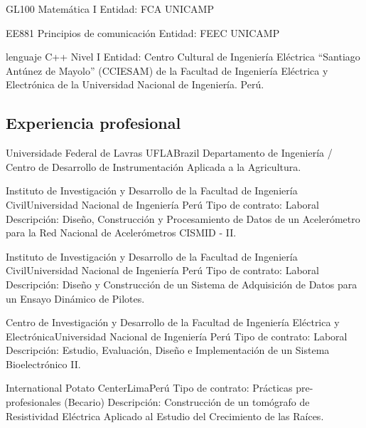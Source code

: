 \documentclass[11pt,a4paper,sans]{moderncv} %
\begin{document}
			  {GL100 }{Matemática I}{}
			  {Entidad: FCA UNICAMP }

			  {EE881 }{Principios de comunicación}{}
			  {Entidad: FEEC UNICAMP }

	      {lenguaje C++ }{ Nivel I}{}
	      {Entidad: Centro Cultural de Ingeniería Eléctrica ``Santiago
 Antúnez de Mayolo'' (CCIESAM) de la Facultad de Ingeniería Eléctrica
 y Electrónica de la Universidad Nacional de Ingeniería. Perú.}

\subsection{Experiencia profesional}


	      {Universidade Federal de Lavras}
	      {UFLA}{Brazil}
	      {Departamento de Ingeniería / Centro de Desarrollo de Instrumentación Aplicada a la Agricultura.}


		      {Instituto de Investigación y Desarrollo de la Facultad
 de Ingeniería Civil}{Universidad Nacional de Ingeniería }{Perú}
		      {Tipo de contrato: Laboral\newline{}
		      Descripción: Diseño, Construcción y Procesamiento de Datos de un
 Acelerómetro para la Red Nacional de Acelerómetros CISMID - II.}

		      {Instituto de Investigación y Desarrollo de la Facultad
 de Ingeniería Civil}{Universidad Nacional de Ingeniería }{Perú}
		      {Tipo de contrato: Laboral\newline{}
		      Descripción: Diseño y Construcción de un Sistema de Adquisición de Datos para un Ensayo  Dinámico  de  Pilotes.}

		      {Centro de Investigación y Desarrollo de la Facultad de
 Ingeniería Eléctrica y Electrónica}{Universidad Nacional de Ingeniería }{Perú}
		      {Tipo de contrato: Laboral\newline{}
		      Descripción: Estudio, Evaluación, Diseño e Implementación de un Sistema Bioelectrónico II.}

		      {International Potato Center}{Lima}{Perú}
		      {Tipo de contrato: Prácticas pre-profesionales (Becario)\newline{}
		      Descripción: Construcción de un tomógrafo de Resistividad Eléctrica Aplicado al Estudio del Crecimiento de las Raíces.}
\end{document}
